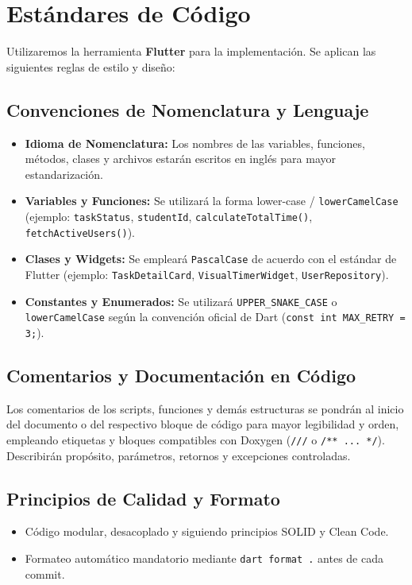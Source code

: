 \section{Estándares de Código}

Utilizaremos la herramienta \textbf{Flutter} para la implementación. Se aplican las siguientes reglas de estilo y diseño:

\subsection{Convenciones de Nomenclatura y Lenguaje}
\begin{itemize}[leftmargin=*]
  \item \textbf{Idioma de Nomenclatura:} Los nombres de las variables, funciones, métodos, clases y archivos estarán escritos en inglés para mayor estandarización.
  \item \textbf{Variables y Funciones:} Se utilizará la forma lower-case / \texttt{lowerCamelCase} (ejemplo: \texttt{taskStatus}, \texttt{studentId}, \texttt{calculateTotalTime()}, \texttt{fetchActiveUsers()}).
  \item \textbf{Clases y Widgets:} Se empleará \texttt{PascalCase} de acuerdo con el estándar de Flutter (ejemplo: \texttt{TaskDetailCard}, \texttt{VisualTimerWidget}, \texttt{UserRepository}).
  \item \textbf{Constantes y Enumerados:} Se utilizará \texttt{UPPER\_SNAKE\_CASE} o \texttt{lowerCamelCase} según la convención oficial de Dart (\texttt{const int MAX\_RETRY = 3;}).
\end{itemize}

\subsection{Comentarios y Documentación en Código}
Los comentarios de los scripts, funciones y demás estructuras se pondrán al inicio del documento o del respectivo bloque de código para mayor legibilidad y orden, empleando etiquetas y bloques compatibles con Doxygen (\texttt{///} o \texttt{/** ... */}). Describirán propósito, parámetros, retornos y excepciones controladas.

\subsection{Principios de Calidad y Formato}
\begin{itemize}[leftmargin=*]
  \item Código modular, desacoplado y siguiendo principios SOLID y Clean Code.
  \item Formateo automático mandatorio mediante \texttt{dart format .} antes de cada commit.
\end{itemize}
